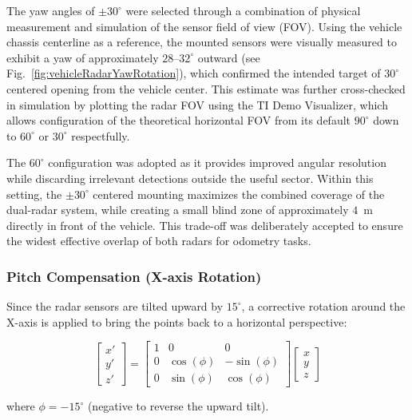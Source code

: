 The yaw angles of $\pm30^\circ$ were selected through a combination of physical measurement and simulation of the sensor field of view (FOV).  
Using the vehicle chassis centerline as a reference, the mounted sensors were visually measured to exhibit a yaw of approximately $28$--$32^\circ$ outward (see Fig.~\ref{fig:vehicleRadarYawRotation}), which confirmed the intended target of $30^\circ$ centered opening from the vehicle center.  
This estimate was further cross-checked in simulation by plotting the radar FOV using the TI Demo Visualizer, which allows configuration of the theoretical horizontal FOV from its default $90^\circ$ down to $60^\circ$ or $30^\circ$ respectfully.  

The $60^\circ$ configuration was adopted as it provides improved angular resolution while discarding irrelevant detections outside the useful sector.  
Within this setting, the $\pm30^\circ$ centered mounting maximizes the combined coverage of the dual-radar system, while creating a small blind zone of approximately $4$~m directly in front of the vehicle.  
This trade-off was deliberately accepted to ensure the widest effective overlap of both radars for odometry tasks.

\vspace{0.5em}
\subsubsection{Pitch Compensation (X-axis Rotation)}
Since the radar sensors are tilted upward by $15^\circ$, a corrective rotation around the X-axis is applied to bring the points back to a horizontal perspective: 

\[
\begin{bmatrix}
x' \\ y' \\ z'
\end{bmatrix}
=
\begin{bmatrix}
1 & 0 & 0 \\
0 & \cos(\phi) & -\sin(\phi) \\
0 & \sin(\phi) & \cos(\phi)
\end{bmatrix}
\begin{bmatrix}
x \\ y \\ z
\end{bmatrix}
\]

where $\phi = -15^\circ$ (negative to reverse the upward tilt).

